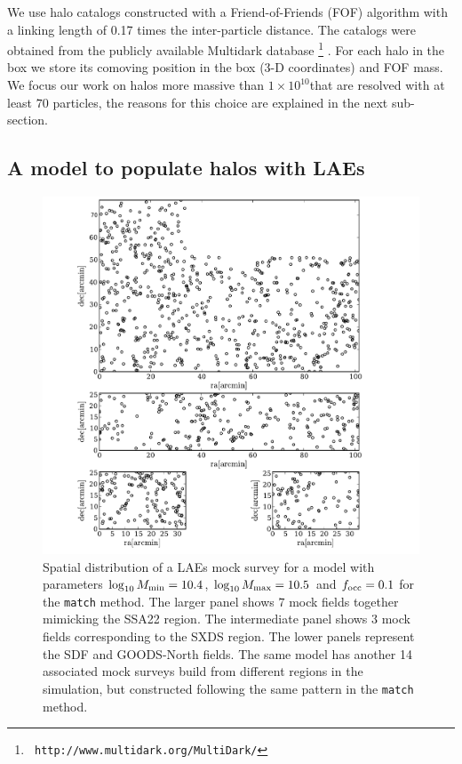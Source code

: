 \documentclass[usenatbib]{mn2e}
\newcommand{\hMsun}{{\ifmmode{h^{-1}{\rm
        {M_{\odot}}}}\else{$h^{-1}{\rm{M_{\odot}}}$}\fi}}
\begin{document}
We use halo catalogs constructed with a Friend-of-Friends (FOF)
algorithm with a linking length of 0.17 times the inter-particle
distance. The catalogs were obtained from the publicly available
Multidark database \footnote{{\tt
    http://www.multidark.org/MultiDark/}}
\citep{MultiDark}. For each halo in the box we store its
comoving position in the box (3-D coordinates) and FOF mass. We focus our work
on halos more massive than $1\times 10^{10}$\hMsun that are resolved
with at least $70$ particles, the reasons for this choice are
explained in the next sub-section.  


\subsection{A model to populate halos with LAEs}
\label{subsec:mocks}



\begin{figure}
\begin{center}
\includegraphics[width=0.8\linewidth,angle=0]{Figure0.pdf}
\caption{ \label{fig:distros} Spatial distribution of a LAEs mock
  survey for a model with parameters $\log_{10}M_{\rm min}=10.4$, $\log_{10}M_{\rm
    max}=10.5$ and $f_{\rm occ}=0.1$ for the {\texttt{match}}
  method. The larger panel shows $7$ mock
  fields together mimicking the SSA22 region. The intermediate panel
  shows $3$ mock fields corresponding to the SXDS region. The lower
  panels represent the SDF and GOODS-North fields. The same model has
  another 14 associated mock surveys build from different regions in
  the simulation, but constructed following the same pattern in the
  {\texttt{match}} method.}
\end{center} 
\end{figure}
\end{document}
